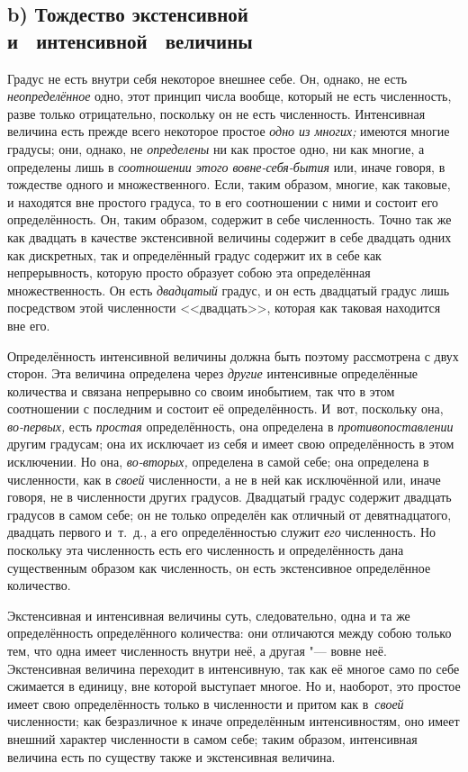 \subsection[b) Тождество экстенсивной и интенсивной величины]%
{b) Тождество экстенсивной\nopagebreak\\и~ интенсивной~ величины}

Градус не есть внутри себя некоторое внешнее себе. Он, однако, не есть
{\em неопределённое} одно, этот принцип числа вообще, который не есть
численность, разве только отрицательно, поскольку он не есть численность.
Интенсивная величина есть прежде всего некоторое простое {\em одно из многих;}
имеются многие градусы; они, однако, не {\em определены} ни как простое одно,
ни как многие, а определены лишь в {\em соотношении этого вовне-себя-бытия} или,
иначе говоря, в тождестве одного и множественного. Если, таким образом, многие,
как таковые, и находятся вне простого градуса, то в его соотношении с ними и
состоит его определённость. Он, таким образом, содержит в себе численность.
Точно так же как двадцать в качестве экстенсивной величины содержит в себе
двадцать одних как дискретных, так и определённый градус содержит их в себе как
непрерывность, которую просто образует собою эта определённая множественность.
Он есть {\em двадцатый} градус, и он есть двадцатый градус лишь посредством
этой численности <<двадцать>>, которая как таковая находится вне его.

Определённость интенсивной величины должна быть поэтому рассмотрена с двух
сторон. Эта величина определена через {\em другие} интенсивные определённые
количества и связана непрерывно со своим инобытием, так что в этом соотношении
с последним и состоит её определённость. И~вот, поскольку она, {\em во-первых,}
есть {\em простая} определённость, она определена в {\em противопоставлении}
другим градусам; она их исключает из себя и имеет свою определённость в этом
исключении. Но она, {\em во-вторых,} определена в самой себе; она определена в
численности, как в {\em своей} численности, а не в ней как исключённой или,
иначе говоря, не в численности других градусов. Двадцатый градус содержит
двадцать градусов в самом себе; он не только определён как отличный от
девятнадцатого, двадцать первого и~т.~д., а его определённостью служит
{\em его} численность. Но поскольку эта численность есть его численность
и определённость дана существенным образом как численность, он есть
экстенсивное определённое количество.

Экстенсивная и интенсивная величины суть, следовательно, одна и та же
определённость определённого количества: они отличаются между собою только тем,
что одна имеет численность внутри неё, а другая "--- вовне неё.
Экстенсивная величина переходит в интенсивную, так как её многое само по себе
сжимается в единицу, вне которой выступает многое. Но и, наоборот, это простое
имеет свою определённость только в численности и притом как в~{\em своей}
численности; как безразличное к иначе определённым интенсивностям, оно имеет
внешний характер численности в самом себе; таким образом, интенсивная величина
есть по существу также и экстенсивная величина.

